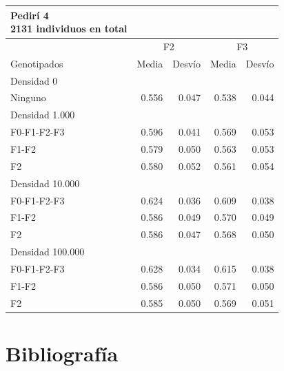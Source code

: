 \documentclass[11pt,spanish,a4paper,oneside,]{book} %
\begin{document}
\begin{longtable}{lrrrr}
\caption*{
{\large Pedirí 4} \\ 
{\small 2131 individuos en total}
} \\ 
\toprule
 & \multicolumn{2}{c}{F2} & \multicolumn{2}{c}{F3} \\ 
 \cmidrule(lr){2-3} \cmidrule(lr){4-5}
Genotipados & Media & Desvío & Media & Desvío \\ 
\midrule
\multicolumn{1}{l}{Densidad 0} \\ 
\midrule
Ninguno & 0.556 & 0.047 & 0.538 & 0.044 \\ 
\midrule
\multicolumn{1}{l}{Densidad 1.000} \\ 
\midrule
F0-F1-F2-F3 & 0.596 & 0.041 & 0.569 & 0.053 \\ 
F1-F2 & 0.579 & 0.050 & 0.563 & 0.053 \\ 
F2 & 0.580 & 0.052 & 0.561 & 0.054 \\ 
\midrule
\multicolumn{1}{l}{Densidad 10.000} \\ 
\midrule
F0-F1-F2-F3 & 0.624 & 0.036 & 0.609 & 0.038 \\ 
F1-F2 & 0.586 & 0.049 & 0.570 & 0.049 \\ 
F2 & 0.586 & 0.047 & 0.568 & 0.050 \\ 
\midrule
\multicolumn{1}{l}{Densidad 100.000} \\ 
\midrule
F0-F1-F2-F3 & 0.628 & 0.034 & 0.615 & 0.038 \\ 
F1-F2 & 0.586 & 0.050 & 0.571 & 0.050 \\ 
F2 & 0.585 & 0.050 & 0.569 & 0.051 \\ 
 \bottomrule
\end{longtable}

\backmatter

\hypertarget{bibliografuxeda}{%
\chapter*{Bibliografía}\label{bibliografuxeda}}

\begingroup
\hspace{\parindent}
\setlength{\parindent}{-0.25in}
\setlength{\leftskip}{0.25in}
\setlength{\parskip}{0pt}
\end{document}
